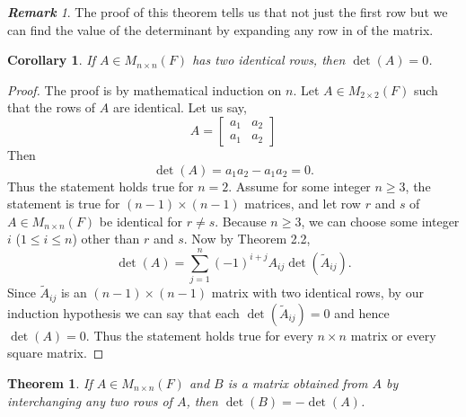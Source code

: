 \documentclass[12pt, a4paper]{article}
\newtheorem{theorem}{Theorem}[section]
\newtheorem{corollary}{Corollary}[theorem]
\theoremstyle{definition}
\theoremstyle{remark}
\newtheorem*{remark}{\textbf{Remark}}
\begin{document}
    \begin{remark}
        The proof of this theorem tells us that not just the first row but we can find the value of the determinant by expanding any row in of the matrix.
        \end{remark}

        \begin{corollary}
        If $A \in M_{n \times n}(F)$ has two identical rows, then $\det(A) = 0$.
        \end{corollary}

        \begin{proof}
        The proof is by mathematical induction on $n$. Let $A \in M_{2 \times 2}(F)$ such that the rows of $A$ are identical. Let us say,
        \[
        A = \begin{bmatrix}
        a_1 & a_2 \\
        a_1 & a_2
        \end{bmatrix}
        \]
        Then
        \[
        \det(A) = a_1 a_2 - a_1 a_2 = 0.
        \]
        Thus the statement holds true for $n=2$. Assume for some integer $n \ge 3$, the statement is true for $(n-1) \times (n-1)$ matrices, and let row $r$ and $s$ of $A \in M_{n \times n}(F)$ be identical for $r \neq s$. Because $n \ge 3$, we can choose some integer $i$ ($1 \le i \le n$) other than $r$ and $s$. Now by Theorem 2.2,
        \[
        \det(A) = \sum_{j=1}^{n} (-1)^{i+j} A_{ij} \det(\widetilde{A}_{ij}).
        \]
        Since $\widetilde{A}_{ij}$ is an $(n-1) \times (n-1)$ matrix with two identical rows, by our induction hypothesis we can say that each $\det(\widetilde{A}_{ij}) = 0$ and hence $\det(A) = 0$. Thus the statement holds true for every $n \times n$ matrix or every square matrix.
        \end{proof}

        \begin{theorem}
        If $A \in M_{n \times n}(F)$ and $B$ is a matrix obtained from $A$ by interchanging any two rows of $A$, then $\det(B) = -\det(A)$.
        \end{theorem}
\end{document}
